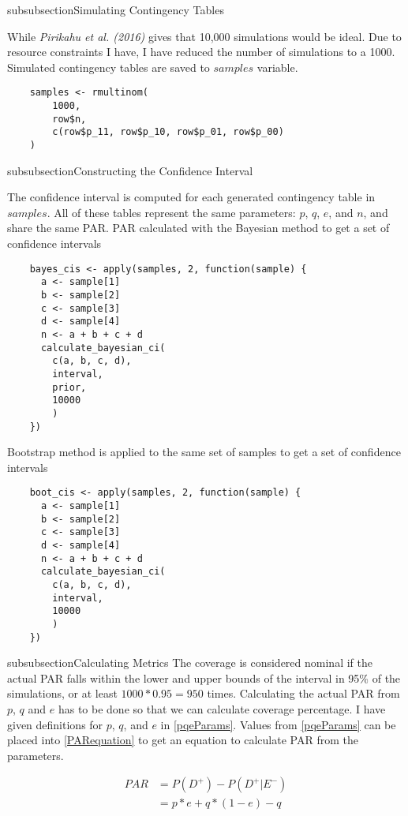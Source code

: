 \*subsubsection{Simulating Contingency Tables}

While \textit{Pirikahu et al. (2016)} gives that 10,000 simulations would be ideal. Due to resource constraints I have, I have  reduced the number of simulations to a 1000. Simulated contingency tables are saved to $samples$ variable.

\begin{lstlisting}
    samples <- rmultinom(
        1000,
        row$n, 
        c(row$p_11, row$p_10, row$p_01, row$p_00)
    )
\end{lstlisting}

\*subsubsection{Constructing the Confidence Interval} \label{constructingCI}

The confidence interval is computed for each generated contingency table in $samples$. All of these tables represent the same parameters: $p$, $q$, $e$, and $n$, and share the same PAR. PAR calculated with the Bayesian method to get a set of confidence intervals

\begin{lstlisting}
    bayes_cis <- apply(samples, 2, function(sample) {
      a <- sample[1]
      b <- sample[2]
      c <- sample[3]
      d <- sample[4]
      n <- a + b + c + d
      calculate_bayesian_ci(
        c(a, b, c, d),
        interval,
        prior,
        10000
        )
    })
\end{lstlisting}

Bootstrap method is applied to the same set of samples to get a set of confidence intervals

\begin{lstlisting}
    boot_cis <- apply(samples, 2, function(sample) {
      a <- sample[1]
      b <- sample[2]
      c <- sample[3]
      d <- sample[4]
      n <- a + b + c + d
      calculate_bayesian_ci(
        c(a, b, c, d),
        interval,
        10000
        )
    })
\end{lstlisting}

\*subsubsection{Calculating Metrics}
The coverage is considered nominal if the actual PAR falls within the lower and upper bounds of the interval in 95\% of the simulations, or at least $1000 * 0.95 = 950$ times. Calculating the actual PAR from $p$, $q$ and $e$ has to be done so that we can calculate coverage percentage. I have given definitions for $p$, $q$, and $e$ in \ref{pqeParams}. Values from \ref{pqeParams} can be placed into \ref{PARequation} to get an equation to calculate PAR from the parameters.

\begin{equation}
\begin{aligned} \label{actualPAR}
    PAR &= P(D^+) - P(D^+| E^-)     \\
        &= p * e + q * (1 - e) - q  \\
\end{aligned}
\end{equation}


